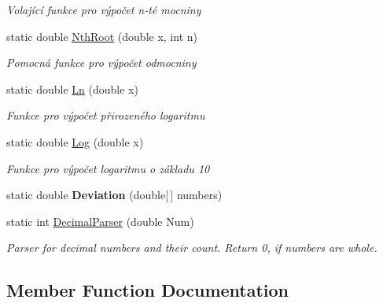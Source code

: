 \begin{DoxyCompactItemize}
\begin{DoxyCompactList}\small\item\em Volající funkce pro výpočet n-\/té mocniny \end{DoxyCompactList}\item 
static double \hyperlink{class_i_v_s_calc_1_1_math_a514b9abce73be4d00096aff1050a49b0}{Nth\+Root} (double x, int n)
\begin{DoxyCompactList}\small\item\em Pomocná funkce pro výpočet odmocniny \end{DoxyCompactList}\item 
static double \hyperlink{class_i_v_s_calc_1_1_math_a6c1a07d2ba9837900a6d1c34c9a77b22}{Ln} (double x)
\begin{DoxyCompactList}\small\item\em Funkce pro výpočet přirozeného logaritmu \end{DoxyCompactList}\item 
static double \hyperlink{class_i_v_s_calc_1_1_math_a4c872cd713ef445303a2034eb67003be}{Log} (double x)
\begin{DoxyCompactList}\small\item\em Funkce pro výpočet logaritmu o základu 10 \end{DoxyCompactList}\item 
\mbox{\label{class_i_v_s_calc_1_1_math_a76b1f14c35c795f01ff1660628873153}} 
static double {\bfseries Deviation} (double\mbox{[}$\,$\mbox{]} numbers)
\item 
static int \hyperlink{class_i_v_s_calc_1_1_math_a7ad6546f556d8dae510d5c69e3b2be6a}{Decimal\+Parser} (double Num)
\begin{DoxyCompactList}\small\item\em Parser for decimal numbers and their count. Return 0, if numbers are whole. \end{DoxyCompactList}\end{DoxyCompactItemize}


\subsection{Member Function Documentation}
\mbox{\label{class_i_v_s_calc_1_1_math_afcc47676081091c0cc9f9becfade23e5}} 
